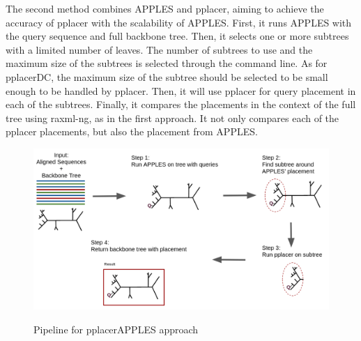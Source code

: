 \documentclass[10pt]{article}
\begin{document}
The second method combines APPLES and pplacer, aiming to achieve the accuracy of pplacer with the scalability of APPLES. First, it runs APPLES with the query sequence and full backbone tree. Then, it selects one or more subtrees with a limited number of leaves. The number of subtrees to use and the maximum size of the subtrees is selected through the command line. As for pplacerDC, the maximum size of the subtree should be selected to be small enough to be handled by pplacer. Then, it will use pplacer for query placement in each of the subtrees. Finally, it compares the placements in the context of the full tree using raxml-ng, as in the first approach. It not only compares each of the pplacer placements, but also the placement from APPLES.

\begin{figure}[h]
\centering
\includegraphics[width=\textwidth]{Figs/pplacerAPPLESpipeline.png}
\label{fig:pplacerAPPLES-pipeline}
\caption{Pipeline for pplacerAPPLES approach
}
\end{figure}
\end{document}
